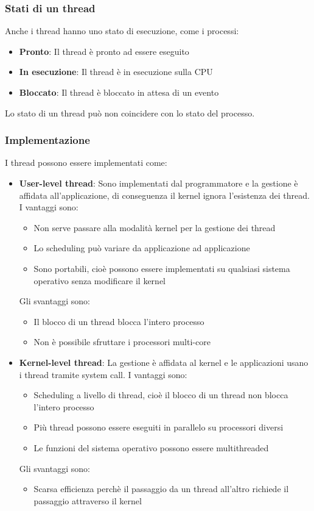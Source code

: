 \documentclass[a4paper]{article}
\begin{document}
\subsubsection{Stati di un thread}
Anche i thread hanno uno stato di esecuzione, come i processi:
\begin{itemize}
  \item \textbf{Pronto}: Il thread è pronto ad essere eseguito
  \item \textbf{In esecuzione}: Il thread è in esecuzione sulla CPU
  \item \textbf{Bloccato}: Il thread è bloccato in attesa di un evento
\end{itemize}
Lo stato di un thread può non coincidere con lo stato del processo.

\subsubsection{Implementazione}
I thread possono essere implementati come:
\begin{itemize}
  \item \textbf{User-level thread}: Sono implementati dal programmatore e la gestione
    è affidata all'applicazione, di conseguenza il kernel ignora l'esistenza dei thread.
    I vantaggi sono:
    \begin{itemize}
      \item Non serve passare alla modalità kernel per la gestione dei thread
      \item Lo scheduling può variare da applicazione ad applicazione
      \item Sono portabili, cioè possono essere implementati su qualsiasi sistema
        operativo senza modificare il kernel
    \end{itemize}
    Gli svantaggi sono:
    \begin{itemize}
      \item Il blocco di un thread blocca l'intero processo
      \item Non è possibile sfruttare i processori multi-core
    \end{itemize}

  \item \textbf{Kernel-level thread}: La gestione è affidata al kernel e le applicazioni
    usano i thread tramite system call.
    I vantaggi sono:
    \begin{itemize}
      \item Scheduling a livello di thread, cioè il blocco di un thread non blocca
        l'intero processo
      \item Più thread possono essere eseguiti in parallelo su processori diversi
      \item Le funzioni del sistema operativo possono essere multithreaded
    \end{itemize}
    Gli svantaggi sono:
    \begin{itemize}
      \item Scarsa efficienza perchè il passaggio da un thread all'altro richiede
        il passaggio attraverso il kernel
    \end{itemize}
\end{itemize}
\end{document}
